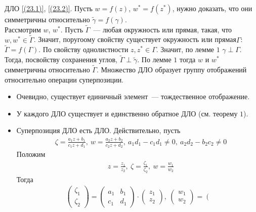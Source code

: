 ДЛО \eqref{(23.1)}, \eqref{(23.2)}. Пусть $w = f(z)$, $w^* = f(z^*)$, нужно
доказать, что они симметричны относительно $\tilde{\gamma} = f(\gamma)$.
\\
Рассмотрим $w$, $w^*$. Пусть $\tilde{\Gamma}$~--- любая окружность или прямая,
такая, что $w, w^* \in \tilde{\Gamma}$. Значит, поругоому свойству существует
окружность или прямая$\Gamma$: $\tilde{\Gamma} = f(\Gamma)$. По свойству
однолистности $z, z^* \in \Gamma$. Значит, по лемме $1$ $\gamma \perp \Gamma$.
Тогда, посвойству сохранения углов, $\tilde{\Gamma} \perp \tilde{\gamma}$. По
лемме $1$ тогда $w$ и $w^*$ симметричны относительно $\tilde{\Gamma}$.
\theorem
Множество ДЛО образует группу отображений относительно операции суперпозиции.
\pr
~
\begin{itemize}
    \item Очевидно, существует единичный элемент~--- тождественное отображение.
    \item У каждого ДЛО существует и единственно обратное ДЛО (см. теорему $1$).
    \item Суперпозиция ДЛО есть ДЛО. Действительно, пусть
    \begin{align*}
      & \zeta = \frac{a_1z+b_1}{c_1z+d_1}, \ w = \frac{a_2z+b_2}{c_2z+d_2}, \ a_1d_1 - c_1d_1 \neq 0, \ a_2d_2 - b_2c_2 \neq 0
    \end{align*}
    Положим
    \begin{align*}
      & z = \frac{z_1}{z_2}, \ \zeta = \frac{\zeta_1}{\zeta_2}, \ w = \frac{w_1}{w_2}
    \end{align*}
    Тогда
    \begin{align*}
      & \left( \begin{matrix}
              \zeta_1 \\
              \zeta_2
          \end{matrix} \right) = \left( \begin{matrix}
              a_1 & b_1 \\
              c_1 & d_1
          \end{matrix} \right) \cdot \left( \begin{matrix}
              z_1 \\
              z_2
          \end{matrix} \right), \ \left( \begin{matrix}
              w_1 \\
              w_2
          \end{matrix} \right) = \left( \begin{matrix}

\end{matrix}
\end{align*}
\end{itemize}
